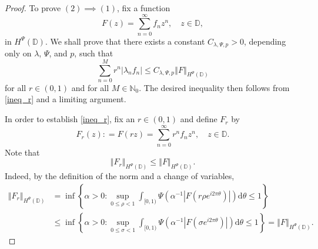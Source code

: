 \documentclass[a4paper, leqno, 10pt]{amsart}
\numberwithin{equation}{section}
\newcommand{\dd}{\mathrm{d}}
\newcommand{\norm}[1]{\left\Vert#1\right\Vert}
\newcommand{\abs}[1]{\left|#1\right|}
\newcommand{\D}{\mathbb{D}}
\newcommand{\N}{\mathbb{N}}
\begin{document}
\begin{proof} To prove $(2) \implies (1)$, fix a function 
\[
F (z) = \sum_{n=0}^{\infty} f_n z^n, \quad z \in \D,
\]
in $H^{\Psi} (\D)$. We shall prove that there exists a constant $C_{\lambda, \Psi, p} > 0$, depending only on $\lambda$, $\Psi$, and $p$, such that
\begin{equation}\label{ineq_r}
\sum_{n=0}^M r^n | \lambda_n f_n| \leq C_{\lambda, \Psi, p}  \norm{ F }_{H^{\Psi} (\D)}
\end{equation}
for all $r \in (0,1)$ and for all $M \in \N_0$. The desired inequality then follows from \eqref{ineq_r} and a limiting argument.

In order to establish \eqref{ineq_r}, fix an $r \in (0,1)$ and define $F_r$ by
\[
F_r (z): = F(rz) = \sum_{n=0}^{\infty} r^n f_n z^n, \quad z \in \D . 
\]
Note that 
\begin{equation}\label{bound_r}
\norm{ F_r }_{H^{\Psi} (\D)} \leq \norm{ F }_{H^{\Psi} (\D)} . 
\end{equation}
Indeed, by the definition of the norm and a change of variables,
\begin{align*}
\norm{ F_r }_{H^{\Psi} (\D)} &  = \inf \left\{ \alpha >0 : \sup_{0 \leq \rho <1} \int_{[0,1)} \Psi \left(\alpha^{-1} \abs{F \left(r \rho e^{i 2\pi \theta} \right)} \right) \dd \theta \leq 1 \right\} \\
%
& \leq \inf \left\{ \alpha >0 : \sup_{0 \leq \sigma < 1} \int_{[0,1)} \Psi \left(\alpha^{-1} \abs{F \left( \sigma e^{i 2\pi \theta} \right)} \right) \dd \theta \leq 1 \right\} = \norm{ F }_{H^{\Psi} (\D)}.
\end{align*}


\end{proof}
\end{document}
